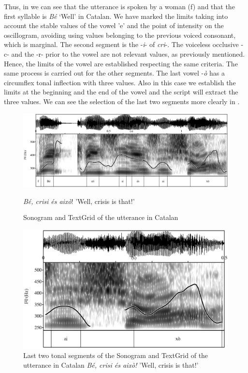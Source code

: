 \documentclass[output=paper]{langscibook}
\begin{document}
Thus, in  we can see that the utterance is spoken by a woman (f) and that the first syllable is \textit{Bé} ‘Well’ in Catalan. We have marked the limits taking into account the stable values of the vowel 'e' and the point of intensity on the oscillogram, avoiding using values belonging to the previous voiced consonant, which is marginal. The second segment is the -\textit{i}- of \textit{cri}-. The voiceless occlusive -c- and the -r- prior to the vowel are not relevant values, as previously mentioned. Hence, the limits of the vowel are established respecting the same criteria. The same process is carried out for the other segments. The last vowel -\textit{ò} has a circumflex tonal inflection with three values. Also in this case we establish the limits at the beginning and the end of the vowel and the script will extract the three values. We can see the selection of the last two segments more clearly in .

\begin{figure}
\includegraphics[width=\textwidth]{figures/FON-img6.eps}
\caption{\label{fig:font:4} Sonogram and TextGrid of the utterance in Catalan}  \textit{Bé, crisi és això}! 'Well, crisis is that!'
 
\end{figure}

\begin{figure}
\includegraphics[width=\textwidth]{figures/FON-img7.eps}
\caption{\label{fig:font:5}  Last two tonal segments of the Sonogram and TextGrid of the utterance in Catalan  \textit{Bé, crisi és això!} 'Well, crisis is that!'
}
\end{figure}
\end{document}
